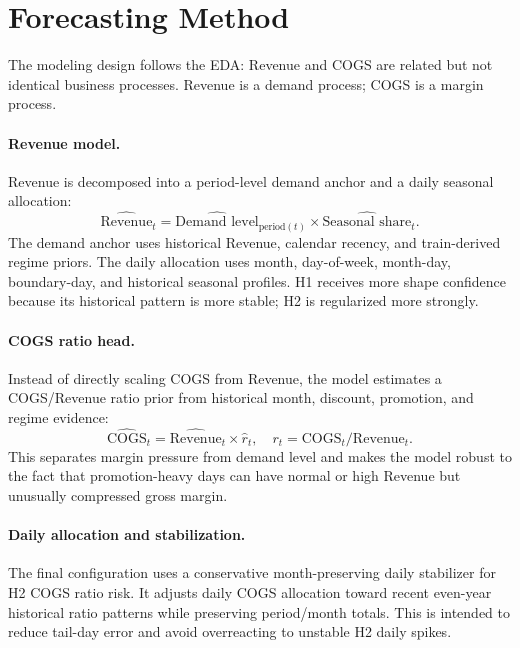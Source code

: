 \section{Forecasting Method}

The modeling design follows the EDA: Revenue and COGS are related but not identical business processes. Revenue is a demand process; COGS is a margin process.

\paragraph{Revenue model.}
Revenue is decomposed into a period-level demand anchor and a daily seasonal allocation:
\[
  \widehat{\text{Revenue}}_t =
  \widehat{\text{Demand level}}_{\text{period}(t)}
  \times
  \widehat{\text{Seasonal share}}_t.
\]
The demand anchor uses historical Revenue, calendar recency, and train-derived regime priors. The daily allocation uses month, day-of-week, month-day, boundary-day, and historical seasonal profiles. H1 receives more shape confidence because its historical pattern is more stable; H2 is regularized more strongly.

\paragraph{COGS ratio head.}
Instead of directly scaling COGS from Revenue, the model estimates a COGS/Revenue ratio prior from historical month, discount, promotion, and regime evidence:
\[
  \widehat{\text{COGS}}_t =
  \widehat{\text{Revenue}}_t
  \times
  \widehat{r}_t,\quad
  r_t = \text{COGS}_t / \text{Revenue}_t.
\]
This separates margin pressure from demand level and makes the model robust to the fact that promotion-heavy days can have normal or high Revenue but unusually compressed gross margin.

\paragraph{Daily allocation and stabilization.}
The final configuration uses a conservative month-preserving daily stabilizer for H2 COGS ratio risk. It adjusts daily COGS allocation toward recent even-year historical ratio patterns while preserving period/month totals. This is intended to reduce tail-day error and avoid overreacting to unstable H2 daily spikes.

